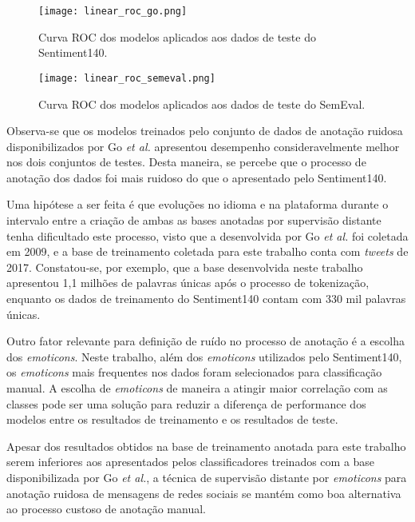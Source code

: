 \begin{figure}
\begin{center} {
    \begin{center}
    \texttt{[image: linear\_roc\_go.png]}
    \caption{Curva ROC dos modelos aplicados aos dados de teste do Sentiment140.}
    \label{fig:linear_roc_go}
    \end{center}
}
\end{center}
\end{figure}

\begin{figure}
\begin{center} {
    \begin{center}
    \texttt{[image: linear\_roc\_semeval.png]}
    \caption{Curva ROC dos modelos aplicados aos dados de teste do SemEval.}
    \label{fig:linear_roc_semeval}
    \end{center}
}
\end{center}
\end{figure}

Observa-se que os modelos treinados pelo conjunto de dados de anotação ruidosa disponibilizados por Go
\textit{et al.} apresentou desempenho consideravelmente melhor nos dois conjuntos de testes.
Desta maneira, se percebe que o processo de anotação dos dados foi mais ruidoso do que o apresentado pelo Sentiment140.

Uma hipótese a ser feita é que evoluções no idioma e na plataforma durante o intervalo entre a criação de ambas as
bases anotadas por supervisão distante tenha dificultado este processo, visto que a desenvolvida por Go \textit{et al.}
foi coletada em 2009, e a base de treinamento coletada para este trabalho conta com \textit{tweets} de 2017.
Constatou-se, por exemplo, que a base desenvolvida neste trabalho apresentou 1,1 milhões de palavras únicas após o
processo de tokenização, enquanto os dados de treinamento do Sentiment140 contam com 330 mil palavras únicas.

Outro fator relevante para definição de ruído no processo de anotação é a escolha dos \textit{emoticons}.
Neste trabalho, além dos \textit{emoticons} utilizados pelo Sentiment140, os \textit{emoticons} mais frequentes nos
dados foram selecionados para classificação manual.
A escolha de \textit{emoticons} de maneira a atingir maior correlação com as classes pode ser uma solução para reduzir
a diferença de performance dos modelos entre os resultados de treinamento e os resultados de teste.

Apesar dos resultados obtidos na base de treinamento anotada para este trabalho serem inferiores aos apresentados pelos
classificadores treinados com a base disponibilizada por Go \textit{et al.}, a técnica de supervisão distante por
\textit{emoticons} para anotação ruidosa de mensagens de redes sociais se mantém como boa alternativa ao processo
custoso de anotação manual.

